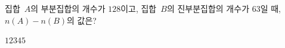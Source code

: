 집합~$A$의 부분집합의 개수가 $128$이고, 집합~$B$의 진부분집합의 개수가 $63$일 때, $n(A)-n(B)$의 값은?
\begin{choices32}{$1$}{$2$}{$3$}{$4$}{$5$}\end{choices32}
